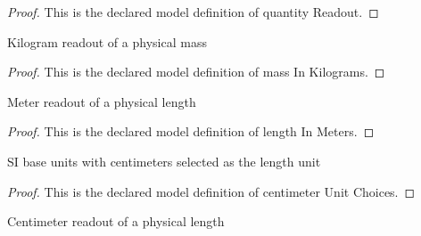 \begin{proof}
  This is the declared model definition of quantity Readout.
\end{proof}
\begin{definition}
  \label{def:physics:phyx-mini-0283:phyxminiproblems-problemphyxmini0283-massinkilograms}
  Kilogram readout of a physical mass
\end{definition}
\begin{proof}
  This is the declared model definition of mass In Kilograms.
\end{proof}
\begin{definition}
  \label{def:physics:phyx-mini-0283:phyxminiproblems-problemphyxmini0283-lengthinmeters}
  Meter readout of a physical length
\end{definition}
\begin{proof}
  This is the declared model definition of length In Meters.
\end{proof}
\begin{definition}
  \label{def:physics:phyx-mini-0283:phyxminiproblems-problemphyxmini0283-centimeterunitchoices}
  SI base units with centimeters selected as the length unit
\end{definition}
\begin{proof}
  This is the declared model definition of centimeter Unit Choices.
\end{proof}
\begin{definition}
  \label{def:physics:phyx-mini-0283:phyxminiproblems-problemphyxmini0283-lengthincentimeters}
  Centimeter readout of a physical length
\end{definition}
